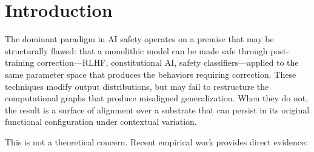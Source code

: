 \documentclass[11pt,a4paper]{article}
\theoremstyle{definition}
\begin{document}
\begin{abstract}
CasIA does not claim to produce an aligned system. It claims to produce an \emph{instrument} where three questions become experimentally answerable: (1)~whether structural separation yields measurable diagnostic gain beyond matched-compute monolithic baselines, (2)~whether alignment-consistent behavior persists under removal of evaluative context, and (3)~whether multi-model architectures can detect failure modes invisible to self-validation. We provide a complete experimental protocol---with matched-compute baselines, poisoned-context stress tests, pre-registered acceptance criteria, and explicit falsification conditions---designed so that negative results are as informative as positive ones.

\medskip
\noindent\textbf{Keywords:} AI behavioral diagnostics, self-validation bounds, multi-model architecture, structural separation, Partial Information Decomposition, functional complementarity, AI safety, laboratory framework.
\end{abstract}

\tableofcontents
\newpage

\section{Introduction}
\label{sec:intro}

The dominant paradigm in AI safety operates on a premise that may be structurally flawed: that a monolithic model can be made safe through post-training correction---RLHF, constitutional AI, safety classifiers---applied to the same parameter space that produces the behaviors requiring correction. These techniques modify output distributions, but may fail to restructure the computational graphs that produce misaligned generalization. When they do not, the result is a surface of alignment over a substrate that can persist in its original functional configuration under contextual variation.

This is not a theoretical concern. Recent empirical work provides direct evidence:
\end{document}
